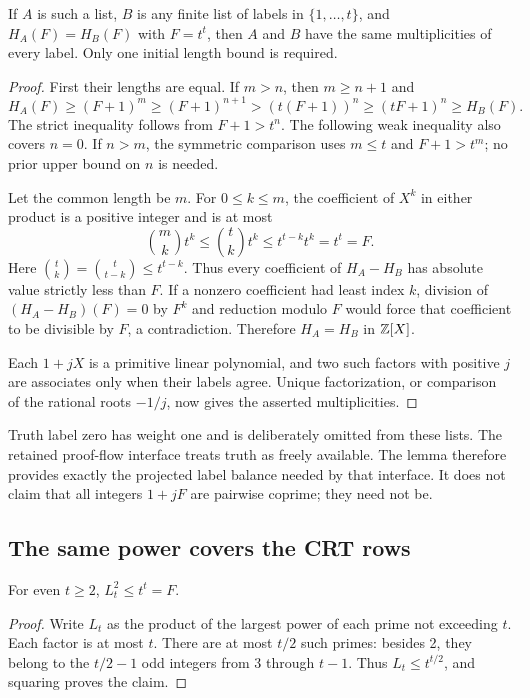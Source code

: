 \begin{lemma}\label{lem:labels}
If $A$ is such a list, $B$ is any finite list of labels in
$\{1,\ldots,t\}$, and $H_A(F)=H_B(F)$ with $F=t^t$, then $A$ and $B$
have the same multiplicities of every label. Only one initial length
bound is required.
\end{lemma}
\begin{proof}
First their lengths are equal. If $m>n$, then $m\ge n+1$ and
\[
 H_A(F)\ge(F+1)^m\ge(F+1)^{n+1}
       >(t(F+1))^n\ge(tF+1)^n\ge H_B(F).
\]
The strict inequality follows from $F+1>t^n$. The following weak
inequality also covers $n=0$. If $n>m$, the symmetric comparison uses
$m\le t$ and $F+1>t^m$; no prior upper bound on $n$ is needed.

Let the common length be $m$. For $0\le k\le m$, the coefficient of
$X^k$ in either product is a positive integer and is at most
\[
 \binom{m}{k}t^k\le\binom{t}{k}t^k
 \le t^{t-k}t^k=t^t=F.
\]
Here $\binom{t}{k}=\binom{t}{t-k}\le t^{t-k}$.
Thus every coefficient of $H_A-H_B$ has absolute value strictly less
than $F$. If a nonzero coefficient had least index $k$, division of
$(H_A-H_B)(F)=0$ by $F^k$ and reduction modulo $F$ would force that
coefficient to be divisible by $F$, a contradiction. Therefore
$H_A=H_B$ in $\mathbb Z[X]$.

Each $1+jX$ is a primitive linear polynomial, and two such factors with
positive $j$ are associates only when their labels agree. Unique
factorization, or comparison of the rational roots $-1/j$, now gives
the asserted multiplicities.
\end{proof}

Truth label zero has weight one and is deliberately omitted from these
lists. The retained proof-flow interface treats truth as freely available.
The lemma therefore provides exactly the projected label balance needed
by that interface. It does not claim that all integers $1+jF$ are pairwise
coprime; they need not be.

\subsection{The same power covers the CRT rows}

\begin{lemma}\label{lem:lcm}
For even $t\ge2$, $L_t^2\le t^t=F$.
\end{lemma}
\begin{proof}
Write $L_t$ as the product of the largest power of each prime not
exceeding $t$. Each factor is at most $t$. There are at most $t/2$
such primes: besides 2, they belong to the $t/2-1$ odd integers from
3 through $t-1$. Thus $L_t\le t^{t/2}$, and squaring proves the claim.
\end{proof}

